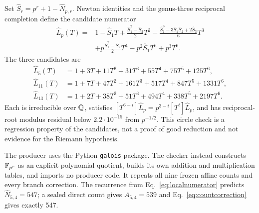 Set $\widehat S_r=p^r+1-\widehat N_{p,r}$.  Newton identities and the
genus-three reciprocal completion define the candidate numerator
\begin{equation}\label{eq:localnumerator}
\begin{split}
\widehat L_p(T)={}&1-\widehat S_1T+
\frac{\widehat S_1^2-\widehat S_2}{2}T^2
-\frac{\widehat S_1^3-3\widehat S_1\widehat S_2+2\widehat S_3}{6}T^3\\
&+p\frac{\widehat S_1^2-\widehat S_2}{2}T^4
-p^2\widehat S_1T^5+p^3T^6.
\end{split}
\end{equation}
The three candidates are
\begin{align*}
\widehat L_5(T)&=1+3T+11T^2+31T^3+55T^4+75T^5+125T^6,\\
\widehat L_{11}(T)&=1+7T+47T^2+161T^3+517T^4+847T^5+1331T^6,\\
\widehat L_{13}(T)&=1+2T+38T^2+51T^3+494T^4+338T^5+2197T^6.
\end{align*}
Each is irreducible over $\mathbb Q$, satisfies
$[T^{6-i}]\widehat L_p=p^{3-i}[T^i]\widehat L_p$, and has
reciprocal-root modulus residual below $2.2\cdot10^{-15}$ from $p^{-1/2}$.
This circle check is a regression property of the candidates, not a proof of
good reduction and not evidence for the Riemann hypothesis.

The producer uses the Python \texttt{galois} package.  The checker instead
constructs $\mathbb F_{p^r}$ as an explicit polynomial quotient, builds its own
addition and multiplication tables, and imports no producer code.  It repeats
all nine frozen affine counts and every branch correction.  The recurrence
from Eq.~\eqref{eq:localnumerator} predicts $\widehat N_{5,4}=547$; a sealed
direct count gives $A_{5,4}=539$ and Eq.~\eqref{eq:countcorrection} gives
exactly 547.
